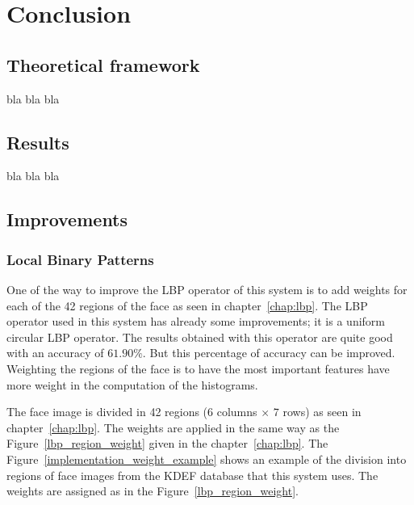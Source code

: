 \chapter{Conclusion}
\label{chap:ccl}
  
\section{Theoretical framework}

\vspace{\baselineskip}
\noindent bla bla bla
\newline

\section{Results}

\vspace{\baselineskip}
\noindent bla bla bla
\newline

\section{Improvements}

\subsection{Local Binary Patterns}

\vspace{\baselineskip}
\noindent One of the way to improve the LBP operator of this system is to add weights for each of the 42 regions of the face as seen in chapter~\ref{chap:lbp}. The LBP operator used in this system has already some improvements; it is a uniform circular LBP operator. The results obtained with this operator are quite good with an accuracy of $ 61.90\% $. But this percentage of accuracy can be improved. Weighting the regions of the face is to have the most important features have more weight in the computation of the histograms.
\newline

\noindent The face image is divided in 42 regions ($ 6 $ columns $ \times $ $ 7 $ rows) as seen in chapter~\ref{chap:lbp}. The weights are applied in the same way as the Figure~\ref{lbp_region_weight} given in the chapter~\ref{chap:lbp}. The Figure~\ref{implementation_weight_example} shows an example of the division into regions of face images from the KDEF database that this system uses. The weights are assigned as in the Figure~\ref{lbp_region_weight}.
\newline

